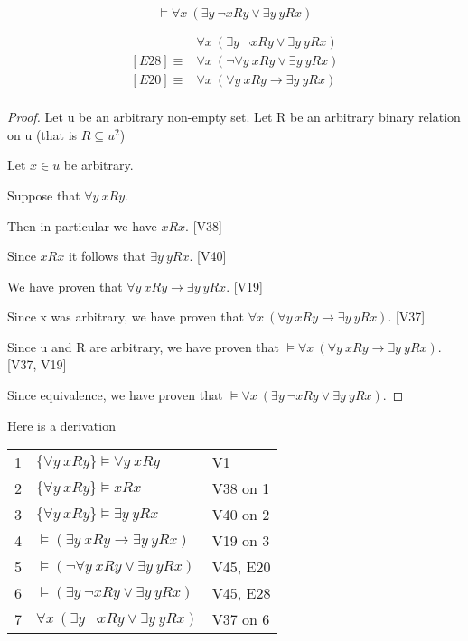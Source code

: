 

\begin{exmp}
\[\vDash \forall x \ (\exists y \ \neg xRy \vee \exists y \ yRx)\]
\end{exmp}

\begin{solution}

\begin{align*}
    &\forall x \ (\exists y \ \neg xRy \vee \exists y \ yRx) \\
    [E28]\equiv & \forall x \ (\neg \forall y \ xRy \vee \exists y \ yRx) \\
    [E20]\equiv & \forall x \ (\forall y \ xRy \to \exists y \ yRx)\\
\end{align*}
\end{solution}

\begin{proof}
Let u be an arbitrary non-empty set. Let R be an arbitrary binary relation on u (that is $R\subseteq u^2$)

Let $x\in u$ be arbitrary. 

Suppose that $\forall y \ xRy$.

Then in particular we have $xRx$. [V38]

Since $xRx$ it follows that $\exists y \ yRx$. [V40]

We have proven that $\forall y \ xRy \to \exists y \ yRx$. [V19]

Since x was arbitrary, we have proven that $\forall x \ (\forall y \ xRy \to \exists y \ yRx)$. [V37]

Since u and R are arbitrary, we have proven that $\vDash \forall x \ (\forall y \ xRy \to \exists y \ yRx)$. [V37, V19]

Since equivalence, we have proven that $\vDash \forall x \ (\exists y \ \neg xRy \vee \exists y \ yRx)$.

\end{proof}

Here is a derivation
\begin{tabular}{rll}
    1  & $\{\forall y \ xRy\} \vDash \forall y \ xRy$ & V1 \\
    2  & $\{\forall y \ xRy\} \vDash xRx$ & V38 on 1 \\
    3  & $\{\forall y \ xRy\} \vDash \exists y \ yRx$ & V40 on 2 \\
    4  & $\vDash (\exists y \ xRy\to \exists y \ yRx)$ & V19 on 3 \\
    5  & $\vDash (\neg \forall y \ xRy \vee \exists y \ yRx)$ & V45, E20 \\
    6  & $\vDash (\exists y \ \neg xRy \vee \exists y \ yRx)$ & V45, E28 \\
    7  & $\forall x \ (\exists y \ \neg xRy \vee \exists y \ yRx)$ & V37 on 6 \\
\end{tabular}

